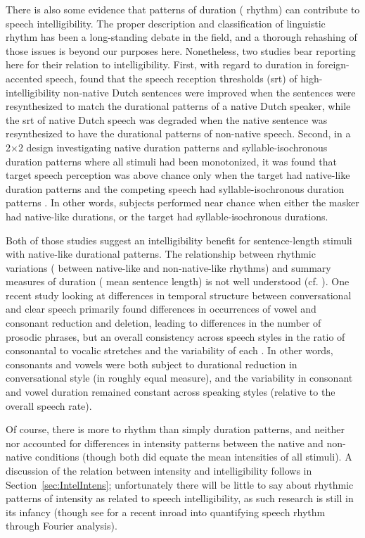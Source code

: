 There is also some evidence that patterns of duration (\ie{} rhythm) can contribute to speech intelligibility.  The proper description and classification of linguistic rhythm has been a long-standing debate in the field, and a thorough rehashing of those issues is beyond our purposes here.\footnotemark{}  Nonetheless, two studies bear reporting here for their relation to intelligibility.  First, with regard to duration in foreign-accented speech, \citet{QueneVanDelft2010} found that the speech reception thresholds (\ac{srt}) of high-intelligibility non-native Dutch sentences were improved when the sentences were resynthesized to match the durational patterns of a native Dutch speaker, while the \ac{srt} of native Dutch speech was degraded when the native sentence was resynthesized to have the durational patterns of non-native speech.  Second, in a 2×2 design investigating native duration patterns and syllable-isochronous duration patterns where all stimuli had been monotonized, it was found that target speech perception was above chance only when the target had native-like duration patterns and the competing speech had syllable-isochronous duration patterns \citep{CushingDellwo2010}.  In other words, subjects performed near chance when either the masker had native-like durations, or the target had syllable-isochronous durations.  

Both of those studies suggest an intelligibility benefit for sentence-length stimuli with native-like durational patterns.  The relationship between rhythmic variations (\eg{} between native-like and non-native-like rhythms) and summary measures of duration (\eg{} mean sentence length) is not well understood (cf. \citealt{Ramus2002}).  One recent study looking at differences in temporal structure between conversational and clear speech primarily found differences in occurrences of vowel and consonant reduction and deletion, leading to differences in the number of prosodic phrases, but an overall consistency across speech styles in the ratio of consonantal to vocalic stretches and the variability of each \citep{SmiljanicBradlow2008}.  In other words, consonants and vowels were both subject to durational reduction in conversational style (in roughly equal measure), and the variability in consonant and vowel duration remained constant across speaking styles (relative to the overall speech rate).

Of course, there is more to rhythm than simply duration patterns, and neither \citet{QueneVanDelft2010} nor \citet{CushingDellwo2010} accounted for differences in intensity patterns between the native and non-native conditions (though both did equate the mean intensities of all stimuli).  A discussion of the relation between intensity and intelligibility follows in Section~\ref{sec:IntelIntens}; unfortunately there will be little to say about rhythmic patterns of intensity as related to speech intelligibility, as such research is still in its infancy (though see \citealt{TilsenJohnson2008} for a recent inroad into quantifying speech rhythm through Fourier analysis).

